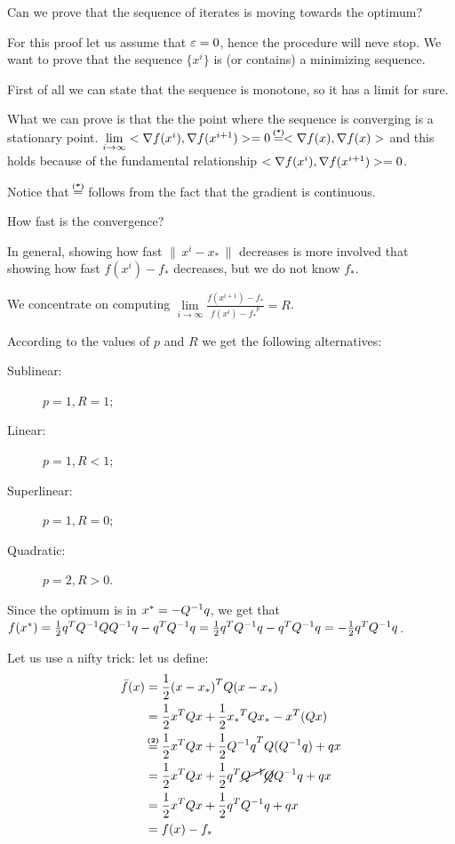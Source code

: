 \documentclass[ComputationalMathematics.tex]{subfiles}
\begin{document}
Can we prove that the sequence of iterates is moving towards the optimum?

For this proof let us assume that $\varepsilon = 0$, hence the procedure will neve stop. We want to prove that the sequence $\{x^i\}$ is (or contains) a minimizing sequence.

First of all we can state that the sequence is monotone, so it has a limit for sure.

What we can prove is that the the point where the sequence is converging is a stationary point.
$\lim\limits_{i \to \infty} \ps{\nabla f(x^i)}{\nabla f(x^{i+1})} = 0 \numeq{(*)} \ps{\nabla f(x)}{\nabla f(x)}$ and this holds because of the fundamental relationship $<\nabla f(x^i), \nabla f(x^{i+1})> = 0$.

Notice that $\numeq{(*)}$ follows from the fact that the gradient is continuous.

How fast is the convergence?

In general, showing how fast $\| \, x^i - x_* \, \|$ decreases is more involved that showing how fast $f(x^i) - f_*$ decreases, but we do not know $f_*$.

We concentrate on computing $\lim\limits_{i \to \infty} \frac{f(x^{i+1}) - f_*}{{f(x^i) - f_*}^p}=R$.

According to the values of $p$ and $R$ we get the following alternatives:
\begin{description}
  \item[{\sc Sublinear:}] $p = 1, R = 1$;
  \item[{\sc Linear:}] $p = 1, R < 1$;
  \item[{\sc Superlinear:}] $p = 1, R = 0$; 
  \item[{\sc Quadratic:}] $p = 2, R > 0$.
\end{description}

Since the optimum is in $x^* = -{Q}^{-1} q$, we get that $f(x^*) = \frac{1}{2} {q}^{T} {Q}^{-1} Q {Q}^{-1} q - {q}^{T} {Q}^{-1} q = \frac{1}{2}  {q}^{T} {Q}^{-1} q - {q}^{T} {Q}^{-1} q = -\frac{1}{2} {q}^{T} {Q}^{-1} q$.

Let us use a nifty trick: let us define:
\begin{equation}
  \begin{split}
    \bar{f}(x) &= \frac{1}{2} \tr{(x-x_*)} Q (x-x_*)\\
    &= \frac{1}{2} \tr{x}Qx + \frac{1}{2} \tr{x_*}Qx_* - \tr{x} (Qx)\\
    &\numeq{(2)} \frac{1}{2} \tr{x} Q x + \frac{1}{2} \tr{\inv{Q} q} Q (\inv{Q} q) + qx\\
    &= \frac{1}{2} \tr{x} Q x + \frac{1}{2} \tr{q} \cancel{\inv{Q}} \cancel{Q} \inv{Q} q + qx\\
    &= \frac{1}{2} \tr{x} Q x + \frac{1}{2} \tr{q} \inv{Q} q + qx\\
    &= f(x) - f_*
  \end{split}
\end{equation}
\end{document}
